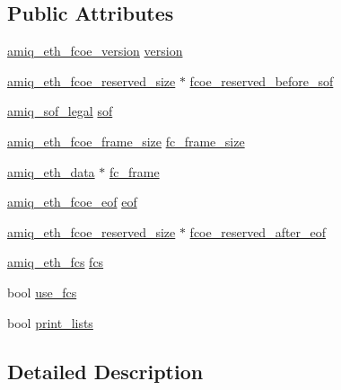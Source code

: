 \subsection*{Public Attributes}
\begin{DoxyCompactItemize}
\item 
\hyperlink{amiq__eth__types_8cpp_a52c27a397c2f1734227ff0fa20c3c463}{amiq\_\-eth\_\-fcoe\_\-version} \hyperlink{classamiq__eth__packet__fcoe_ad8ebe22dab7fcf728dbcb1353aead75a}{version}
\item 
\hyperlink{amiq__eth__types_8cpp_ab91426b193c9d785b26eab0fafeb37d4}{amiq\_\-eth\_\-fcoe\_\-reserved\_\-size} $\ast$ \hyperlink{classamiq__eth__packet__fcoe_a12c47cb7c8c88a33452e77cc939a537e}{fcoe\_\-reserved\_\-before\_\-sof}
\item 
\hyperlink{amiq__eth__types_8cpp_af76674e5304b9edc017f724a00bb450c}{amiq\_\-sof\_\-legal} \hyperlink{classamiq__eth__packet__fcoe_aa6a32da303dff37582cf2aa1ec127531}{sof}
\item 
\hyperlink{amiq__eth__types_8cpp_a6c8c792413bc1b4fdfcef78d585dc59b}{amiq\_\-eth\_\-fcoe\_\-frame\_\-size} \hyperlink{classamiq__eth__packet__fcoe_a3bff6efa35437af20ee1bc17af91ec45}{fc\_\-frame\_\-size}
\item 
\hyperlink{amiq__eth__types_8cpp_a3595a0a508d433d383d3e5521fc0b723}{amiq\_\-eth\_\-data} $\ast$ \hyperlink{classamiq__eth__packet__fcoe_a64d80e48f4ede107bb86908f9f1b8b1b}{fc\_\-frame}
\item 
\hyperlink{amiq__eth__types_8cpp_af8426b958ea3d0f17a118a0306312920}{amiq\_\-eth\_\-fcoe\_\-eof} \hyperlink{classamiq__eth__packet__fcoe_a36a4571a088c2cfb6fdf850926bee2eb}{eof}
\item 
\hyperlink{amiq__eth__types_8cpp_ab91426b193c9d785b26eab0fafeb37d4}{amiq\_\-eth\_\-fcoe\_\-reserved\_\-size} $\ast$ \hyperlink{classamiq__eth__packet__fcoe_a266138e5bb3e111d68da8d3c1e22f562}{fcoe\_\-reserved\_\-after\_\-eof}
\item 
\hyperlink{amiq__eth__types_8cpp_adb511dc715b55539c6abdad1de981a9f}{amiq\_\-eth\_\-fcs} \hyperlink{classamiq__eth__packet__fcoe_a487ea28eaec60b68c048d93908c304ff}{fcs}
\item 
bool \hyperlink{classamiq__eth__packet__fcoe_aa30ddf7a61b901c161522c827db7fa3e}{use\_\-fcs}
\item 
bool \hyperlink{classamiq__eth__packet__fcoe_a5bf897bdb64335afe41e55c2a879ac5d}{print\_\-lists}
\end{DoxyCompactItemize}


\subsection{Detailed Description}


